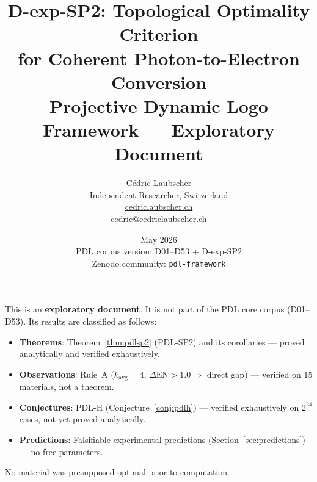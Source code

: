 \documentclass[12pt,a4paper]{article}
\newenvironment{epistemicbox}{%
  \begin{tcolorbox}[colback=yellow!8,colframe=yellow!60!black,
    title={\bfseries Epistemic Status},breakable]}%
  {\end{tcolorbox}}
\newcommand{\DEN}{\Delta\mathrm{EN}}
\begin{document}
\title{\textbf{D-exp-SP2: Topological Optimality Criterion\\
for Coherent Photon-to-Electron Conversion}\\[6pt]
{\large Projective Dynamic Logo Framework — Exploratory Document}}

\author{C\'edric Laubscher\\[4pt]
\small Independent Researcher, Switzerland\\
\small \href{https://cedriclaubscher.ch}{cedriclaubscher.ch}\\
\small \href{mailto:cedric@cedriclaubscher.ch}{cedric@cedriclaubscher.ch}}

\date{May 2026\\[4pt]
\small PDL corpus version: D01--D53 + D-exp-SP2\\
\small Zenodo community: \texttt{pdl-framework}}

\maketitle

\begin{epistemicbox}
This is an \textbf{exploratory document}. It is not part of the PDL core
corpus (D01--D53). Its results are classified as follows:
\begin{itemize}[noitemsep]
  \item \textbf{Theorems}: Theorem~\ref{thm:pdlsp2} (PDL-SP2) and its
    corollaries — proved analytically and verified exhaustively.
  \item \textbf{Observations}: Rule~A ($k_{\mathrm{avg}}=4$,
    $\DEN>1.0\Rightarrow$ direct gap) — verified on 15 materials,
    not a theorem.
  \item \textbf{Conjectures}: PDL-H (Conjecture~\ref{conj:pdlh}) —
    verified exhaustively on $2^{24}$ cases, not yet proved analytically.
  \item \textbf{Predictions}: Falsifiable experimental predictions
    (Section~\ref{sec:predictions}) — no free parameters.
\end{itemize}
No material was presupposed optimal prior to computation.
\end{epistemicbox}
\end{document}
